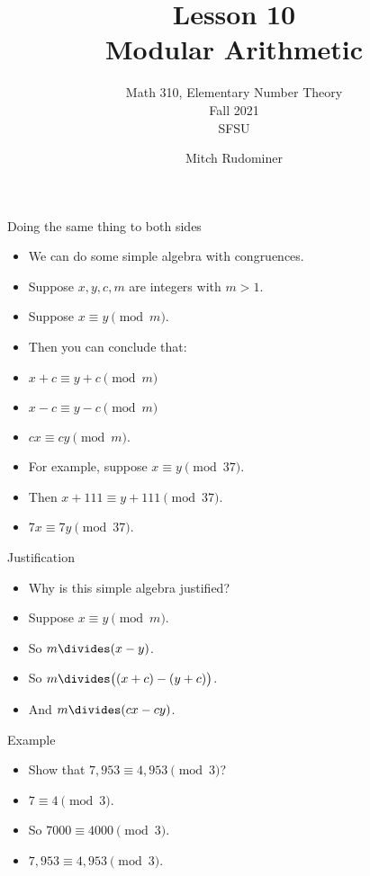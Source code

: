 \documentclass[handout]{beamer}
\title{Lesson 10 \\ Modular Arithmetic}
\subtitle{Math 310, Elementary Number Theory \\ Fall 2021 \\ SFSU}
\author{Mitch Rudominer}
\date{}
\begin{document}
\begin{frame}
  \titlepage
\end{frame}

\begin{frame}{Doing the same thing to both sides}

\begin{itemize}
  \item We can do some simple algebra with congruences.
  \item Suppose $x,y,c,m$ are integers with $m>1$.
  \item Suppose $x\equiv y \pmod m$.
  \item Then you can conclude that:
  \item $x+c\equiv y+c \pmod m$
  \item $x-c\equiv y-c \pmod m$
  \item $cx \equiv cy \pmod m$.
  \item For example, suppose $x\equiv y \pmod {37}$.
  \item Then $x+111\equiv y+111 \pmod {37}$.
  \item $7x \equiv 7y \pmod {37}$.
\end{itemize}

\end{frame}

\begin{frame}{Justification}

\begin{itemize}
  \item Why is this simple algebra justified?
  \item Suppose $x\equiv y \pmod m$.
  \item So $m \divides (x-y)$.
  \item So $m \divides \big( (x+c) - (y+c) \big)$.
  \item And $m \divides (cx - cy)$.
\end{itemize}

\end{frame}

\begin{frame}{Example}

\begin{itemize}
  \item Show that $7,953 \equiv  4,953 \pmod 3$?
  \item $7\equiv 4  \pmod 3$.
  \item So $7000 \equiv 4000 \pmod 3$.
  \item $7,953 \equiv  4,953 \pmod 3$.
\end{itemize}

\end{frame}
\end{document}

